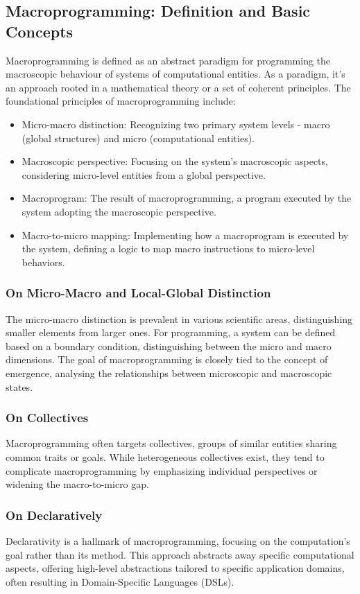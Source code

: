 \subsection{Macroprogramming: Definition and Basic Concepts}
Macroprogramming is defined as an abstract paradigm for programming the macroscopic behaviour of systems of computational entities. As a paradigm, it's an approach rooted in a mathematical theory or a set of coherent principles. The foundational principles of macroprogramming include:
\begin{itemize}
    \item Micro-macro distinction: Recognizing two primary system levels - macro (global structures) and micro (computational entities).
    \item Macroscopic perspective: Focusing on the system's macroscopic aspects, considering micro-level entities from a global perspective.
    \item Macroprogram: The result of macroprogramming, a program executed by the system adopting the macroscopic perspective.
    \item Macro-to-micro mapping: Implementing how a macroprogram is executed by the system, defining a logic to map macro instructions to micro-level behaviors.
\end{itemize}

\subsubsection{On Micro-Macro and Local-Global Distinction}
The micro-macro distinction is prevalent in various scientific areas, distinguishing smaller elements from larger ones. For programming, a system can be defined based on a boundary condition, distinguishing between the micro and macro dimensions. The goal of macroprogramming is closely tied to the concept of emergence, analysing the relationships between microscopic and macroscopic states.

\subsubsection{On Collectives}
Macroprogramming often targets collectives, groups of similar entities sharing common traits or goals. While heterogeneous collectives exist, they tend to complicate macroprogramming by emphasizing individual perspectives or widening the macro-to-micro gap.

\subsubsection{On Declaratively}
Declarativity is a hallmark of macroprogramming, focusing on the computation's goal rather than its method. This approach abstracts away specific computational aspects, offering high-level abstractions tailored to specific application domains, often resulting in Domain-Specific Languages (DSLs).

